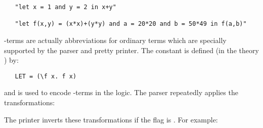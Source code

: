 \begin{hol}\begin{verbatim}
   "let x = 1 and y = 2 in x+y"

   "let f(x,y) = (x*x)+(y*y) and a = 20*20 and b = 50*49 in f(a,b)"
\end{verbatim}\end{hol}

-terms are actually abbreviations for ordinary  terms which are
specially supported by the parser and pretty printer. 
The constant  is defined (in the theory ) by:

\begin{hol}
\begin{verbatim}
   LET = (\f x. f x)
\end{verbatim}\end{hol}

\noindent and is used to encode -terms in the logic. The parser
repeatedly applies the transformations:

\bigskip

\noindent
{\small{}}

\bigskip


\noindent The printer inverts these transformations if the flag
 is .  For example:

